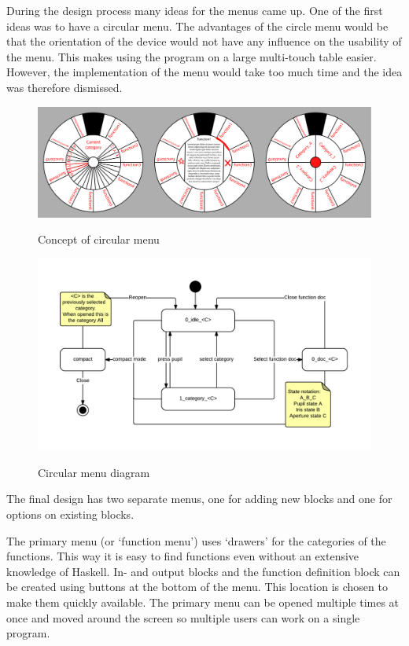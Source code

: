 During the design process many ideas for the menus came up.
One of the first ideas was to have a circular menu. \label{circular_menu} 
The advantages of the circle menu would be that the orientation of the device would not have any influence on the usability of the menu.
This makes using the program on a large multi-touch table easier.
However, the implementation of the menu would take too much time and the idea was therefore dismissed.

\begin{figure}[p]
	\centering
	\includegraphics[width=\textwidth]{Images/circlary}
	\label{fig:circlary}
	\caption{Concept of circular menu}
\end{figure}
\begin{figure}[p]
	\centering
	\includegraphics[scale=0.5]{Images/diagram-circlary}
	\label{fig:diagram-circlary}
	\caption{Circular menu diagram}
\end{figure}

The final design has two separate menus, one for adding new blocks and one for options on existing blocks.

The primary menu (or `function menu') uses `drawers' for the categories of the functions.  
This way it is easy to find functions even without an extensive knowledge of Haskell.
In- and output blocks and the function definition block can be created using buttons at the bottom of the menu.
This location is chosen to make them quickly available.
The primary menu can be opened multiple times at once and moved around the screen so multiple users can work on a single program.


